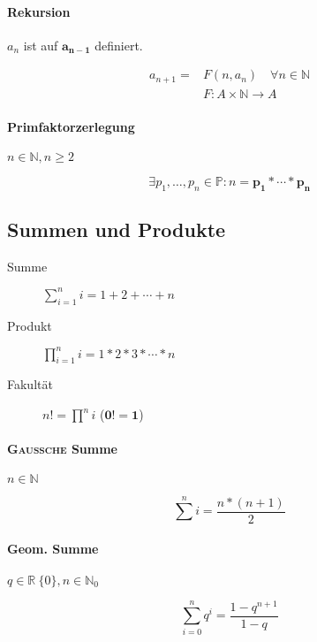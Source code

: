 \paragraph{Rekursion} $a_n$ ist auf $\mathbf{a_{n-1}}$ definiert.

\begin{align*}
      a_{n+1} = & F(n, a_n) \quad \forall n \in \mathbb{N} \\
                & F: A \times \mathbb{N} \rightarrow A
\end{align*}

\paragraph{Primfaktorzerlegung} $n\in \mathbb{N}, n \geq 2$

$$\exists p_1, \dots, p_n \in \mathbb{P}: n = \mathbf{p_1 * \cdots * p_n}$$

\subsection{Summen und Produkte}

\begin{description}
      \item [Summe] $\sum_{i = 1}^n i = 1 + 2 + \cdots + n$

      \item [Produkt] $\prod_{i = 1}^n i = 1 * 2 * 3 * \cdots * n$

      \item [Fakultät] $n! = \prod^n i$ ($\mathbf{0! = 1}$)
\end{description}

\paragraph{\textsc{Gaussche} Summe} $n \in \mathbb{N}$

$$\sum^n i = \frac{n * (n + 1)}{2}$$

\paragraph{Geom. Summe} $q \in \mathbb{R} \ \{ 0 \}, n \in \mathbb{N}_0$

$$\sum_{i=0}^n q^i = \frac{1 - q^{n+1}}{1 - q}$$


